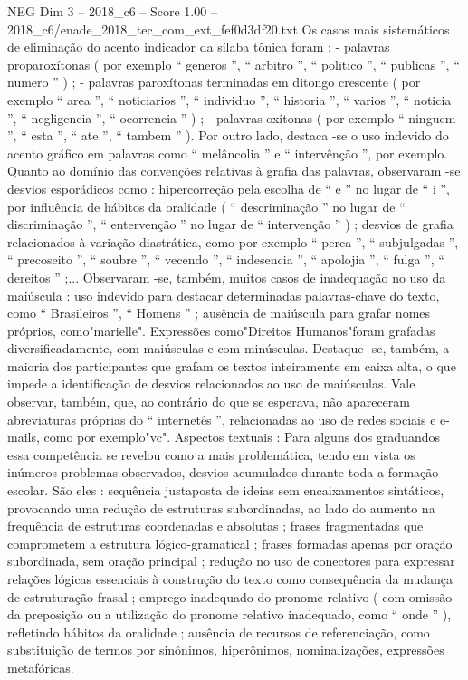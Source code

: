 \begin{textsample}{NEG Dim 3 – 2018\_c6 – Score 1.00 – 2018\_c6/enade\_2018\_tec\_com\_ext\_fef0d3df20.txt}
Os casos mais sistemáticos de eliminação do acento indicador da sílaba tônica foram : - palavras proparoxítonas ( por exemplo “ generos ”, “ arbitro ”, “ politico ”, “ publicas ”, “ numero ” ) ; - palavras paroxítonas terminadas em ditongo crescente ( por exemplo “ area ”, “ noticiarios ”, “ individuo ”, “ historia ”, “ varios ”, “ noticia ”, “ negligencia ”, “ ocorrencia ” ) ; - palavras oxítonas ( por exemplo “ ninguem ”, “ esta ”, “ ate ”, “ tambem ” ).
Por outro lado, destaca -se o uso indevido do acento gráfico em palavras como “ melâncolia ” e “ intervênção ”, por exemplo.
Quanto ao domínio das convenções relativas à grafia das palavras, observaram -se desvios esporádicos como : hipercorreção pela escolha de “ e ” no lugar de “ i ”, por influência de hábitos da oralidade ( “ descriminação ” no lugar de “ discriminação ”, “ entervenção ” no lugar de “ intervenção ” ) ; desvios de grafia relacionados à variação diastrática, como por exemplo “ perca ”, “ subjulgadas ”, “ precoseito ”, “ soubre ”, “ vecendo ”, “ indesencia ”, “ apolojia ”, “ fulga ”, “ dereitos ” ;...
Observaram -se, também, muitos casos de inadequação no uso da maiúscula : uso indevido para destacar determinadas palavras-chave do texto, como “ Brasileiros ”, “ Homens ” ; ausência de maiúscula para grafar nomes próprios, como"marielle".
Expressões como"Direitos Humanos"foram grafadas diversificadamente, com maiúsculas e com minúsculas.
Destaque -se, também, a maioria dos participantes que grafam os textos inteiramente em caixa alta, o que impede a identificação de desvios relacionados ao uso de maiúsculas.
Vale observar, também, que, ao contrário do que se esperava, não apareceram abreviaturas próprias do “ internetês ”, relacionadas ao uso de redes sociais e e-mails, como por exemplo"vc".
Aspectos textuais : Para alguns dos graduandos essa competência se revelou como a mais problemática, tendo em vista os inúmeros problemas observados, desvios acumulados durante toda a formação escolar.
São eles : sequência justaposta de ideias sem encaixamentos sintáticos, provocando uma redução de estruturas subordinadas, ao lado do aumento na frequência de estruturas coordenadas e absolutas ; frases fragmentadas que comprometem a estrutura lógico-gramatical ; frases formadas apenas por oração subordinada, sem oração principal ; redução no uso de conectores para expressar relações lógicas essenciais à construção do texto como consequência da mudança de estruturação frasal ; emprego inadequado do pronome relativo ( com omissão da preposição ou a utilização do pronome relativo inadequado, como “ onde ” ), refletindo hábitos da oralidade ; ausência de recursos de referenciação, como substituição de termos por sinônimos, hiperônimos, nominalizações, expressões metafóricas.

\end{textsample}
